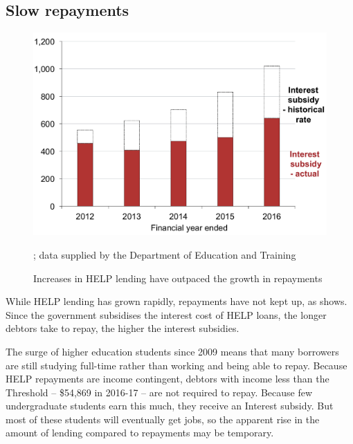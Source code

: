 \documentclass[embargoed]{grattan}
\begin{document}
\subsection{Slow repayments }\label{slow-repayments}

\begin{figure}
\caption{Increases in \gls{HELP} lending have outpaced the growth in repayments}\label{fig:fig7-increases-help-lending-outpaced-growth-repayments}


\includegraphics[page=7]{atlas/Chartpack.pdf}

%
{\textcites{Education2015Highereducationreport}{Education20152014VETFEEa}; data supplied by the Department of Education and Training}
\end{figure}

While \gls{HELP} lending has grown rapidly, repayments have not kept up, as  shows.
Since the government subsidises the interest cost of \gls{HELP} loans, the longer debtors take to repay, the higher the interest subsidies.

The surge of higher education students since 2009 means that many borrowers are still studying full-time rather than working and being able to repay.
Because \gls{HELP} repayments are income contingent, debtors with income less than the \gls{Threshold} -- \$54,869 in 2016-17 -- are not required to repay.
Because few undergraduate students earn this much, they receive an \gls{Interest subsidy}.
But most of these students will eventually get jobs, so the apparent rise in the amount of lending compared to repayments may be temporary.
\end{document}
